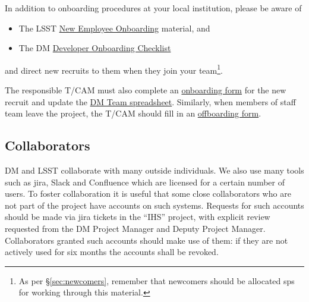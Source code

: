 In addition to onboarding procedures at your local institution, please
be aware of

\begin{itemize}
\item
  The LSST \href{https://project.lsst.org/onboarding}{New Employee
  Onboarding} material, and
\item
  The DM
  \href{https://developer.lsst.io/getting-started/onboarding.html}{Developer
  Onboarding Checklist}
\end{itemize}

and direct new recruits to them when they join your team\footnote{As per \S\ref{sec:newcomers}, remember that newcomers should be allocated \glspl{sp} for working through this material.}.

The responsible T/CAM must also complete an \href{https://project.lsst.org/onboarding/form}{onboarding form} for the new recruit and update the \href{https://docs.google.com/spreadsheets/d/1G9KXBJJHfWkVDQeApfXaN_nZjD_YUJlHiEDOzhTy-0c/edit?usp=drive_web}{DM Team spreadsheet}.
Similarly, when members of staff team leave the project, the T/CAM should fill in an \href{https://project.lsst.org/onboarding/offboarding_form}{offboarding form}.

\subsection{Collaborators}
\label{sec:collaborators}

DM and LSST collaborate with many outside individuals.
We also use many tools such as \gls{jira}, Slack and Confluence which are licensed for a certain number of users.
To foster collaboration it is useful that some close collaborators who are not part of the project have accounts on such systems.
Requests for such accounts should be made via \gls{jira} tickets in the “IHS”
project, with explicit review requested from the DM Project Manager and Deputy Project Manager.
Collaborators granted such accounts should make use of them: if they are not actively used for six months the accounts shall be revoked.
